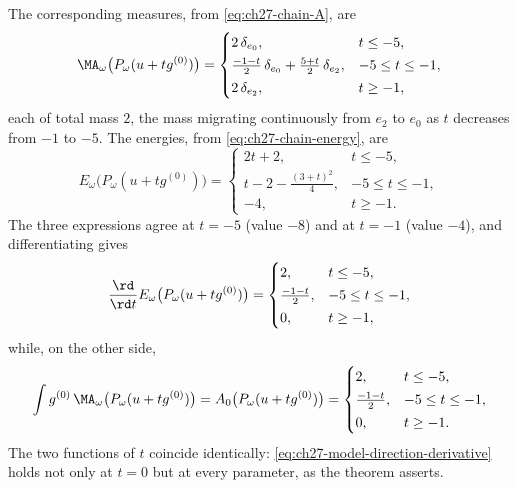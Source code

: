 \begin{example}
The corresponding measures, from \eqref{eq:ch27-chain-A}, are
\[
 \MA_\omega\bigl(P_\omega(u+tg^{(0)})\bigr)
 =\begin{cases}
   2\,\delta_{e_0}, & t\leq-5,\\[2pt]
   \tfrac{-1-t}2\,\delta_{e_0}+\tfrac{5+t}2\,\delta_{e_2},
     & -5\leq t\leq-1,\\[2pt]
   2\,\delta_{e_2}, & t\geq-1,
  \end{cases}
\]
each of total mass \(2\), the mass migrating continuously from \(e_2\) to
\(e_0\) as \(t\) decreases from \(-1\) to \(-5\).  The energies, from
\eqref{eq:ch27-chain-energy}, are
\[
 E_\omega\bigl(P_\omega(u+tg^{(0)})\bigr)
 =\begin{cases}
   2t+2, & t\leq-5,\\[2pt]
   t-2-\tfrac{(3+t)^2}4, & -5\leq t\leq-1,\\[2pt]
   -4, & t\geq-1 .
  \end{cases}
\]
The three expressions agree at \(t=-5\) (value \(-8\)) and at \(t=-1\)
(value \(-4\)), and differentiating gives
\[
 \frac{\rd}{\rd t}
 E_\omega\bigl(P_\omega(u+tg^{(0)})\bigr)
 =\begin{cases}
   2, & t\leq-5,\\[2pt]
   \tfrac{-1-t}2, & -5\leq t\leq-1,\\[2pt]
   0, & t\geq-1,
  \end{cases}
\]
while, on the other side,
\[
 \int g^{(0)}\,\MA_\omega\bigl(P_\omega(u+tg^{(0)})\bigr)
 =A_0\bigl(P_\omega(u+tg^{(0)})\bigr)
 =\begin{cases}
   2,& t\leq-5,\\[2pt]
   \tfrac{-1-t}2,& -5\leq t\leq-1,\\[2pt]
   0,& t\geq-1 .
  \end{cases}
\]  The two functions of \(t\)
coincide identically:
\eqref{eq:ch27-model-direction-derivative} holds not only at \(t=0\) but at
every parameter, as the theorem asserts.


\end{example}

